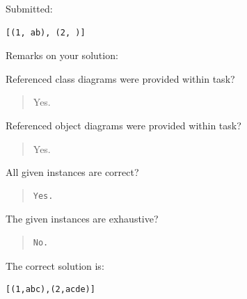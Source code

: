 Submitted:


\begin{verbatim}
[(1, ab), (2, )]
\end{verbatim}


Remarks on your solution:

Referenced class diagrams were provided within task?\begin{quote}Yes.\end{quote}Referenced object diagrams were provided within task?\begin{quote}Yes.\end{quote}All given instances are correct?

\begin{quote}
\begin{verbatim}
Yes.
\end{verbatim}
\end{quote}

The given instances are exhaustive?

\begin{quote}
\begin{verbatim}
No.
\end{verbatim}
\end{quote}

The correct solution is:
\begin{verbatim}
[(1,abc),(2,acde)]
\end{verbatim}


